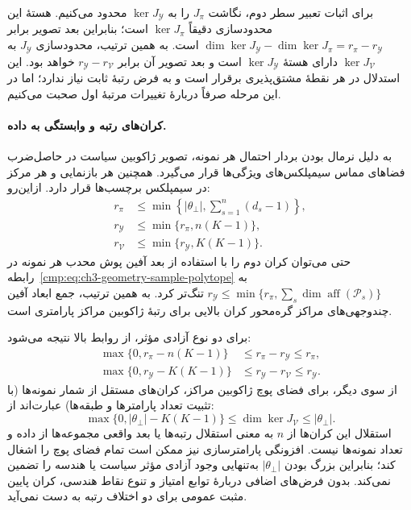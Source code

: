 برای اثبات تعبیر سطر دوم، نگاشت $J_\pi$ را به $\ker J_{\mathscr Y}$ محدود می‌کنیم. هستهٔ این محدودسازی دقیقاً $\ker J_\pi$ است؛ بنابراین بعد تصویر برابر $\dim\ker J_{\mathscr Y}-\dim\ker J_\pi=r_\pi-r_{\mathscr Y}$ است. به همین ترتیب، محدودسازی $J_{\mathscr Y}$ به $\ker J_{\mathcal V}$ دارای هستهٔ $\ker J_{\mathscr Y}$ است و بعد تصویر آن برابر $r_{\mathscr Y}-r_{\mathcal V}$ خواهد بود. این استدلال در هر نقطهٔ مشتق‌پذیری برقرار است و به فرض رتبهٔ ثابت نیاز ندارد؛ اما در این مرحله صرفاً دربارهٔ تغییرات مرتبهٔ اول صحبت می‌کنیم.

\paragraph{کران‌های رتبه و وابستگی به داده.}
به دلیل نرمال بودن بردار احتمال هر نمونه، تصویر ژاکوبین سیاست در حاصل‌ضرب فضاهای مماس سیمپلکس‌های ویژگی‌ها قرار می‌گیرد. همچنین هر بازنمایی و هر مرکز در سیمپلکس برچسب‌ها قرار دارد. ازاین‌رو:
\begin{equation}\label{cmp:eq:ch3-geometry-parametric-rank-bounds}
\boxed{\begin{aligned}
r_\pi&\le\min\left\{|\theta_\bot|,\sum_{s=1}^{n}(d_s-1)\right\},\\
r_{\mathscr Y}&\le\min\{r_\pi,n(K-1)\},\\
r_{\mathcal V}&\le\min\{r_{\mathscr Y},K(K-1)\}.
\end{aligned}}
\end{equation}
حتی می‌توان کران دوم را با استفاده از بعد آفین پوش محدب هر نمونه در رابطه~\eqref{cmp:eq:ch3-geometry-sample-polytope} به $r_{\mathscr Y}\le\min\{r_\pi,\sum_s\dim\operatorname{aff}(\mathcal P_s)\}$ تنگ‌تر کرد. به همین ترتیب، جمع ابعاد آفین چندوجهی‌های مراکز گره‌محور کران بالایی برای رتبهٔ ژاکوبین مراکز پارامتری است.

برای دو نوع آزادی مؤثر، از روابط بالا نتیجه می‌شود:
\begin{equation}\label{cmp:eq:ch3-geometry-parametric-effective-bounds}
\begin{aligned}
\max\{0,r_\pi-n(K-1)\}&\le r_\pi-r_{\mathscr Y}\le r_\pi,\\
\max\{0,r_{\mathscr Y}-K(K-1)\}&\le r_{\mathscr Y}-r_{\mathcal V}\le r_{\mathscr Y}.
\end{aligned}
\end{equation}
از سوی دیگر، برای فضای پوچ ژاکوبین مراکز، کران‌های مستقل از شمار نمونه‌ها (با تثبیت تعداد پارامترها و طبقه‌ها) عبارت‌اند از:
\begin{equation}\label{cmp:eq:ch3-geometry-parametric-center-null-bounds}
\max\{0,|\theta_\bot|-K(K-1)\}\le\dim\ker J_{\mathcal V}\le|\theta_\bot|.
\end{equation}
استقلال این کران‌ها از $n$ به معنی استقلال رتبه‌ها یا بعد واقعی مجموعه‌ها از داده و تعداد نمونه‌ها نیست. افزونگی پارامترسازی نیز ممکن است تمام فضای پوچ را اشغال کند؛ بنابراین بزرگ بودن $|\theta_\bot|$ به‌تنهایی وجود آزادی مؤثر سیاست یا هندسه را تضمین نمی‌کند. بدون فرض‌های اضافی دربارهٔ توابع امتیاز و تنوع نقاط هندسی، کران پایین مثبت عمومی برای دو اختلاف رتبه به دست نمی‌آید.

